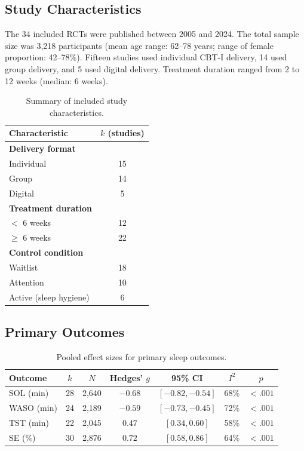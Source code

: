 \documentclass[
    language=english,
    doctype=meta-analysis,
    institution=none,
]{../../omnilatex}
\begin{document}
\subsection{Study Characteristics}

The 34 included RCTs were published between 2005 and 2024. The total sample size was
3,218 participants (mean age range: 62--78 years; range of female proportion: 42--78\%).
Fifteen studies used individual CBT-I delivery, 14 used group delivery, and 5 used digital
delivery. Treatment duration ranged from 2 to 12 weeks (median: 6 weeks).

\begin{table}[htbp]
    \centering
    \caption{Summary of included study characteristics.}
    \label{tab:study-characteristics}
    \begin{tabular}{@{}lc@{}}
        \toprule
        Characteristic & $k$ (studies) \\
        \midrule
        \textbf{Delivery format} & \\
        \quad Individual & 15 \\
        \quad Group & 14 \\
        \quad Digital & 5 \\[6pt]
        \textbf{Treatment duration} & \\
        \quad $<$ 6 weeks & 12 \\
        \quad $\geq$ 6 weeks & 22 \\[6pt]
        \textbf{Control condition} & \\
        \quad Waitlist & 18 \\
        \quad Attention & 10 \\
        \quad Active (sleep hygiene) & 6 \\
        \bottomrule
    \end{tabular}
\end{table}

\subsection{Primary Outcomes}

\begin{table}[htbp]
    \centering
    \caption{Pooled effect sizes for primary sleep outcomes.}
    \label{tab:primary-outcomes}
    \begin{tabular}{@{}lcccccc@{}}
        \toprule
        Outcome & $k$ & $N$ & Hedges' $g$ & 95\% CI & $I^2$ & $p$ \\
        \midrule
        SOL (min) & 28 & 2,640 & $-0.68$ & $[-0.82, -0.54]$ & 68\% & $< .001$ \\
        WASO (min) & 24 & 2,189 & $-0.59$ & $[-0.73, -0.45]$ & 72\% & $< .001$ \\
        TST (min) & 22 & 2,045 & $0.47$ & $[0.34, 0.60]$ & 58\% & $< .001$ \\
        SE (\%) & 30 & 2,876 & $0.72$ & $[0.58, 0.86]$ & 64\% & $< .001$ \\
        \bottomrule
    \end{tabular}
\end{table}
\end{document}

